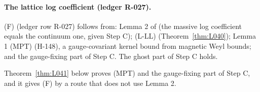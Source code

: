 \paragraph{The lattice log coefficient (ledger R-027).}
\begin{proposition}\label{src:T2-F-STEPB-b}
(F) (ledger row R-027) follows from: Lemma 2 of  (the massive log coefficient equals the continuum one, given Step C); (L-LL) (Theorem~\ref{thm:L040}); Lemma 1 (MPT) (H-148), a gauge-covariant kernel bound from magnetic Weyl bounds; and the gauge-fixing part of Step C. The ghost part of Step C holds.
\end{proposition}
Theorem~\ref{thm:L041} below proves (MPT) and the gauge-fixing part of Step C, and it gives (F) by a route that does not use Lemma 2.

